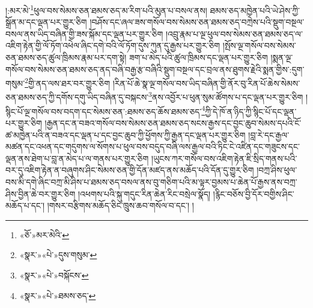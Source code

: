 །:མར་མེ་\footnote{«ཅོ་»མར་མེའི་}ཕུལ་བས་སེམས་ཅན་ཐམས་ཅད་མ་རིག་པའི་མུན་པ་བསལ་ནས། ཐམས་ཅད་མཁྱེན་པའི་ཡེ་ཤེས་ཀྱི་སྒྲོན་མ་དང་ལྡན་པར་གྱུར་ཅིག །བཤོས་དང་ཞལ་ཟས་གསོལ་བས་སེམས་ཅན་ཐམས་ཅད་བཀྲེས་པའི་སྡུག་བསྔལ་བསལ་ནས་ཡིད་བཞིན་གྱི་ཟས་སྐོམ་དང་ལྡན་པར་གྱུར་ཅིག །འབྲུ་རྣམ་པ་ལྔ་ཕུལ་བས་སེམས་ཅན་ཐམས་ཅད་ལ་འཇིག་རྟེན་གྱི་ལོ་ཏོག་འཕེལ་ཞིང་དགེ་བའི་ལོ་ཏོག་དུས་ཀུན་དུ་རྒྱས་པར་གྱུར་ཅིག །སྤོས་ལྔ་གསོལ་བས་སེམས་ཅན་ཐམས་ཅད་ཚུལ་ཁྲིམས་རྣམ་པར་དག་སྟེ། ཟག་པ་མེད་པའི་ཚུལ་ཁྲིམས་དང་ལྡན་པར་གྱུར་ཅིག །སྨན་ལྔ་གསོལ་བས་སེམས་ཅན་ཐམས་ཅད་ནད་བཞི་བརྒྱ་རྩ་བཞིའི་སྡུག་བསྔལ་དང་བྲལ་ནས་ཐུགས་རྗེའི་སྨན་གྱིས་:དུག་གསུམ་\footnote{«སྣར་»«པེ་»དུས་གསུམ་}གྱི་ནད་ལས་ཐར་བར་གྱུར་ཅིག །རིན་པོ་ཆེ་སྣ་ལྔ་གསོལ་བས་ཡིད་བཞིན་གྱི་ནོར་བུ་རིན་པོ་ཆེས་སེམས་ཅན་ཐམས་ཅད་ཀྱི་དགོས་དགུ་ཡིད་བཞིན་དུ་བསྐངས་\footnote{«སྣར་»«པེ་»བསྐོངས་}ནས་འབྱོར་པ་ཕུན་སུམ་ཚོགས་པ་དང་ལྡན་པར་གྱུར་ཅིག །སྙིང་པོ་ལྔ་གསོལ་བས་བདག་དང་སེམས་ཅན་:ཐམས་ཅད་ཆོས་ཐམས་ཅད་\footnote{«སྣར་»«པེ་»ཐམས་ཅད་}ཀྱི་དེ་ཁོ་ན་ཉིད་ཀྱི་སྙིང་པོ་དང་ལྡན་པར་གྱུར་ཅིག །རྒྱན་དང་ན་བཟའ་གསོལ་བས་སེམས་ཅན་ཐམས་ཅད་སངས་རྒྱས་དང་བྱང་ཆུབ་སེམས་དཔའི་ངོ་ཚ་མཁྱེན་པའི་ན་བཟའ་དང་ལྡན་པ་དང་བྱང་ཆུབ་ཀྱི་ཕྱོགས་ཀྱི་རྒྱན་དང་ལྡན་པར་གྱུར་ཅིག །བླ་རེ་དང་རྒྱལ་མཚན་དང་འཕན་དང་གདུགས་ལ་སོགས་པ་ཕུལ་བས་བདུད་བཞི་ལས་རྒྱལ་བའི་ཏིང་ངེ་འཛིན་དང་གཟུངས་དང་ལྡན་ནས་ཐེག་པ་བླ་ན་མེད་པ་ལ་གནས་པར་གྱུར་ཅིག །ཡུངས་ཀར་གསོལ་བས་འཇིག་རྟེན་ཇི་སྲིད་གནས་པའི་བར་དུ་འཇིག་རྟེན་ན་བཞུགས་ཤིང་སེམས་ཅན་གྱི་དོན་མཛད་ནས་མཆོད་པའི་དོན་དུ་གྱུར་ཅིག །བཀྲ་ཤིས་ཕུལ་བས་མི་དགེ་ཞིང་བཀྲ་མི་ཤིས་པ་ཐམས་ཅད་བསལ་ནས་བུ་གཅིག་པའི་མ་ལྟར་བྱམས་པ་ཆེན་པོ་རྒྱས་ནས་བཀྲ་ཤིས་བྱིན་ཆེ་བར་གྱུར་ཅིག །འཕགས་པའི་སྐུ་གདུང་རིན་ཆེན་རིང་བསྲེལ་སྣོད། །རྙིང་བཅོས་བྱི་དོར་བགྱིས་ཤིང་མཆོད་པ་དང་། །གསར་བརྩིགས་མཆོད་ཅིང་ཁྲུས་ཆབ་གསོལ་བ་དང་། །
